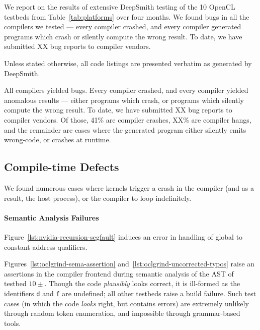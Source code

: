 We report on the results of extensive DeepSmith testing of the 10 OpenCL testbeds from Table~\ref{tab:platforms} over four months. We found bugs in all the compilers we tested --- every compiler crashed, and every compiler generated programs which crash or silently compute the wrong result. To date, we have submitted XX bug reports to compiler vendors. %

Unless stated otherwise, all code listings are presented verbatim as generated by DeepSmith.

 All compilers yielded bugs. Every compiler crashed, and every compiler yielded anomalous results --- either programs which crash, or programs which silently compute the wrong result. To date, we have submitted XX bug reports to compiler vendors. Of those, 41\% are compiler crashes, XX\% are compiler hangs, and the remainder are cases where the generated program either silently emits wrong-code, or crashes at runtime. 


\subsection{Compile-time Defects}%
\label{subsec:compile-time-defects}

We found numerous cases where kernels trigger a crash in the compiler (and as a result, the host process), or the compiler to loop indefinitely.







\paragraph{Semantic Analysis Failures} %

Figure~\ref{lst:nvidia-recursion-segfault} induces an error in handling of global to constant address qualifiers.

Figures~\ref{lst:oclgrind-sema-assertion} and~\ref{lst:oclgrind-uncorrected-typos} raise an assertions in the compiler frontend during semantic analysis of the AST of testbed $10\pm$. Though the code \emph{plausibly} looks correct, it is ill-formed as the identifiers \texttt{d} and \texttt{f} are undefined; all other testbeds raise a build failure. Such test cases (in which the code \emph{looks} right, but contains errors) are extremely unlikely through random token enumeration, and impossible through grammar-based tools. 

